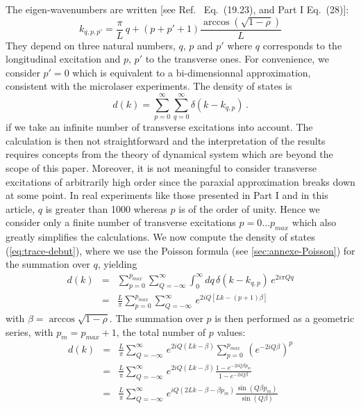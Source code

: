 \documentclass[10pt]{iopart}
\begin{document}
The eigen-wavenumbers are written [see Ref.~\cite{Siegman1986} Eq.~(19.23), and Part I Eq.~(28)]:
\begin{equation}\label{eq:frequences-propres}
k_{q, p, p'} = \frac{\pi}{L} \, q+(p+p'+1) \frac{\arccos(\sqrt{1-\rho})}{L}
\end{equation}
They depend on three natural numbers, $q$, $p$ and $p'$ where $q$ corresponds to the longitudinal excitation and $p, \, p'$ to the transverse ones. For convenience, we consider $p' = 0$ which is equivalent to a bi-dimensionnal approximation, consistent with the microlaser experiments. The density of states is
\begin{equation}\label{eq:trace-debut}
d(k) = \sum_{p = 0}^\infty \sum_{q = 0}^\infty \delta(k - k_{q,p}) \, .
\end{equation}
if we take an infinite number of transverse excitations into account. The calculation is then not straightforward and the interpretation of the results requires concepts from the theory of dynamical system which are beyond the scope of this paper. Moreover, it is not meaningful to consider transverse excitations of arbitrarily high order since the paraxial approximation breaks down at some point. In real experiments like those presented in Part I and in this article, $q$ is greater than 1000 whereas $p$ is of the order of unity. Hence we consider only a finite number of transverse excitations $p = 0 \ldots p_{max}$ which also greatly simplifies the calculations. We now compute the density of states (\ref{eq:trace-debut}), where we use the Poisson formula (see \ref{sec:annexe-Poisson}) for the summation over $q$, yielding
\begin{eqnarray}
d(k) & = & \sum_{p=0}^{p_{max}} \sum_{Q=-\infty}^\infty \int_0^{\infty}dq \, \delta(k - k_{q,p}) \, e^{2 i \pi Qq} \\
 & = & \frac{L}{\pi} \sum_{p=0}^{p_{max}}\sum_{Q=-\infty}^\infty\, e^{2i Q [Lk - (p+1) \beta]}
\end{eqnarray}
with $\beta=\arccos\sqrt{1-\rho}$. The summation over $p$ is then performed as a geometric series, with $p_m=p_{max}+1$, the total number of $p$ values:
\begin{eqnarray}
d(k) & = & \frac{L}{\pi} \sum_{Q = -\infty}^\infty \, e^{2i Q(Lk - \beta)} \sum_{p=0}^{p_{max}}\, \left( e^{-2i Q\beta} \right)^p \label{eq:serie-divergente} \\
 & = & \frac{L}{\pi} \sum_{Q=-\infty}^\infty \, e^{2i Q(Lk-\beta)}\frac{1-e^{-2i Q\beta p_m}}{1-e^{-2i Q\beta}}\\
  & = & \frac{L}{\pi} \sum_{Q=-\infty}^\infty \, e^{iQ(2Lk-\beta-\beta p_m)}\frac{\sin (Q\beta p_m)}{\sin (Q\beta)}\label{eq:trace-serie-geo}
\end{eqnarray}
\end{document}
